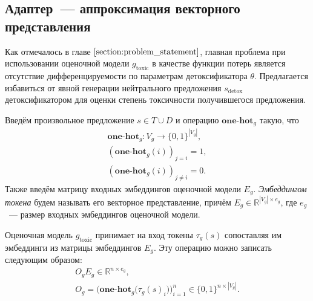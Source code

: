 \subsection{Адаптер~--- аппроксимация векторного представления} 
\label{section:adapter_defenition}
Как отмечалось в главе $\ref{section:problem_statement}$, главная проблема при использовании оценочной модели $g_{\text{toxic}}$ в качестве функции потерь является отсутствие дифференцируемости по параметрам детоксификатора $\theta$.
Предлагается избавиться от явной генерации нейтрального предложения $s_{\text{detox}}$ детоксификатором для оценки степень токсичности получившегося предложения.

Введём произвольное предложение $s \in T \cup D$ и операцию $\textbf{one-hot}_{g}$ такую, что 
\begin{gather*}
    \textbf{one-hot}_{g}: V_{g} \to \{0, 1\}^{|V_{g}|}, \\ 
    \left(\textbf{one-hot}_{g} (i)\right)_{j = i} = 1, \\ 
    \left(\textbf{one-hot}_{g} (i)\right)_{j \not= i} = 0. 
\end{gather*}
Также введём матрицу входных эмбеддингов оценочной модели $E_g$. 
\textit{Эмбеддингом токена} будем называть его векторное представление, причём $E_g \in \mathbb{R}^{|V_g| \times e_g}$, где $e_g$~--- размер входных эмбеддингов оценочной модели.

Оценочная модель $g_{\text{toxic}}$ принимает на вход токены $\tau_{g}(s)$ сопоставляя им эмбеддинги из матрицы эмбеддингов $E_g $.
Эту операцию можно записать следующим образом:
\begin{gather*}
    O_{g} E_g \in \mathbb{R}^{n \times e_g}, \\
    O_{g} = \bigl(\textbf{one-hot}_{g} \bigl(\tau_{g}(s)_{i} \bigr)\bigr)_{i=1}^{n} \in \{0, 1\}^{n \times |V_g|}.
\end{gather*}

